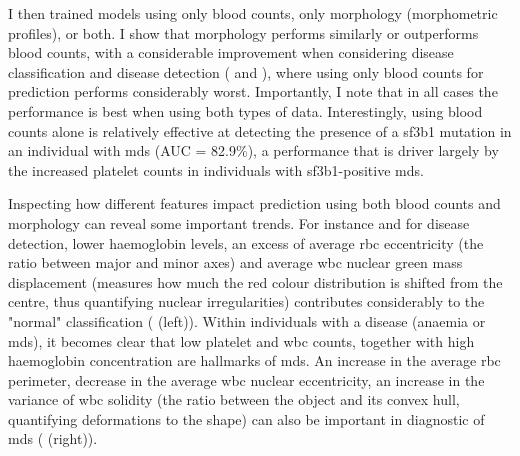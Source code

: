 \begin{figure}[!ht]
    \label{fig:glmnet-vs-rf-auc}
\end{figure}

I then trained models using only blood counts, only morphology (morphometric profiles), or both. I show that morphology performs similarly or outperforms blood counts, with a considerable improvement when considering disease classification and disease detection ( and ), where using only blood counts for prediction performs considerably worst. Importantly, I note that in all cases the performance is best when using both types of data. Interestingly, using blood counts alone is relatively effective at detecting the presence of a \ac{sf3b1} mutation in an individual with \ac{mds} (AUC = 82.9\%), a performance that is driver largely by the increased platelet counts in individuals with \ac{sf3b1}-positive \ac{mds}.

\begin{figure}[!ht]
    \label{fig:roc-curves-binary}
\end{figure}

\begin{figure}[!ht]
    \label{fig:auc-binary}
\end{figure}

Inspecting how different features impact prediction using both blood counts and morphology can reveal some important trends. For instance and for disease detection, lower haemoglobin levels, an excess of average \ac{rbc} eccentricity (the ratio between major and minor axes) and average \ac{wbc} nuclear green mass displacement (measures how much the red colour distribution is shifted from the centre, thus quantifying nuclear irregularities) contributes considerably to the "normal" classification ( (left)). Within individuals with a disease (anaemia or \ac{mds}), it becomes clear that low platelet and \ac{wbc} counts, together with high haemoglobin concentration are hallmarks of \ac{mds}. An increase in the average \ac{rbc} perimeter, decrease in the average \ac{wbc} nuclear eccentricity, an increase in the variance of \ac{wbc} solidity (the ratio between the object and its convex hull, quantifying deformations to the shape) can also be important in diagnostic of \ac{mds} ( (right)).

